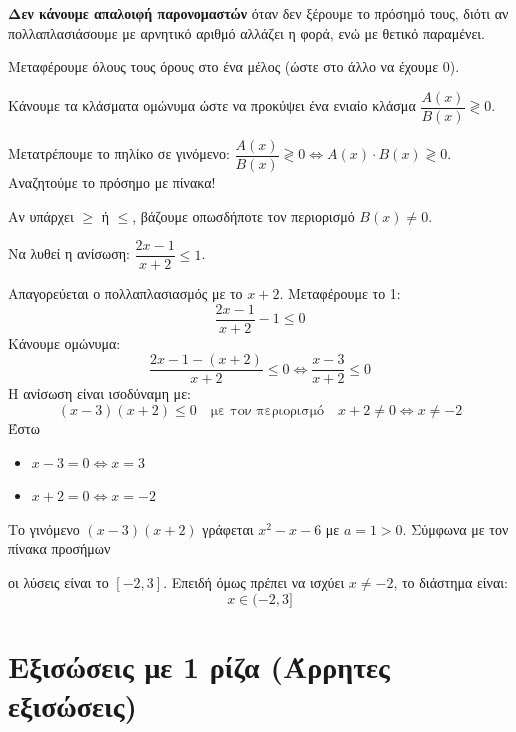 \bhmata
\begin{bhma}
    \item \textbf{Δεν κάνουμε απαλοιφή παρονομαστών} όταν δεν ξέρουμε το πρόσημό τους, διότι αν πολλαπλασιάσουμε με αρνητικό αριθμό αλλάζει η φορά, ενώ με θετικό παραμένει.
    \item Μεταφέρουμε όλους τους όρους στο ένα μέλος (ώστε στο άλλο να έχουμε 0).
    \item Κάνουμε τα κλάσματα ομώνυμα ώστε να προκύψει ένα ενιαίο κλάσμα $\dfrac{A(x)}{B(x)} \gtrless 0$.
    \item Μετατρέπουμε το πηλίκο σε γινόμενο: $\dfrac{A(x)}{B(x)} \gtrless 0 \Leftrightarrow A(x) \cdot B(x) \gtrless 0$. Αναζητούμε το πρόσημο με πίνακα!
    \item Αν υπάρχει $\geq$ ή $\leq$, βάζουμε οπωσδήποτε τον περιορισμό $B(x) \neq 0$.
\end{bhma}


Να λυθεί η ανίσωση: $\dfrac{2x - 1}{x + 2} \leq 1$.

\lysh
Απαγορεύεται ο πολλαπλασιασμός με το $x+2$. Μεταφέρουμε το 1:
\[ \dfrac{2x - 1}{x + 2} - 1 \leq 0 \]
Κάνουμε ομώνυμα:
\[ \dfrac{2x - 1 - (x + 2)}{x + 2} \leq 0 \Leftrightarrow \dfrac{x - 3}{x + 2} \leq 0 \]
Η ανίσωση είναι ισοδύναμη με:
\[ (x - 3)(x + 2) \leq 0 \quad \text{με τον περιορισμό} \quad x + 2 \neq 0 \Leftrightarrow x \neq -2 \]
Έστω
\begin{itemize}
\item $x-3=0\Leftrightarrow x=3$
\item $x+2=0\Leftrightarrow x=-2$
\end{itemize}

Το γινόμενο $(x-3)(x+2)$ γράφεται $x^2 - x - 6$ με $a = 1 > 0$. Σύμφωνα με τον πίνακα προσήμων
\begin{center}
\end{center}
οι λύσεις είναι το $[-2, 3]$. Επειδή όμως πρέπει να ισχύει $x \neq -2$, το διάστημα είναι:
\[ x \in (-2, 3] \]

\section{Εξισώσεις με 1 ρίζα (Άρρητες εξισώσεις)}

